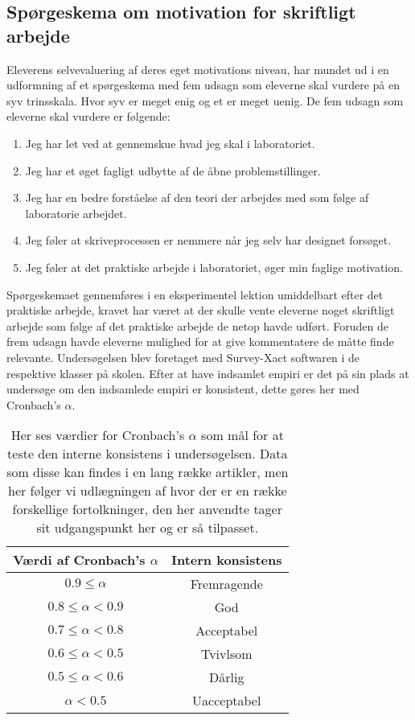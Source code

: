 \subsection{Spørgeskema om motivation for skriftligt arbejde}
\label{sub:3.2.a}
Eleverens selvevaluering af deres eget motivations niveau, har mundet ud i en udformning af et spørgeskema med fem udsagn som eleverne skal vurdere på en syv trinsskala. Hvor syv er meget enig og et er meget uenig. De fem udsagn som eleverne skal vurdere er følgende:
\begin{enumerate}
	\item Jeg har let ved at gennemskue hvad jeg skal i laboratoriet.
 	\item Jeg har et øget fagligt udbytte af de åbne problemstillinger.
	\item Jeg har en bedre forståelse af den teori der arbejdes med som følge af laboratorie arbejdet.
	\item Jeg føler at skriveprocessen er nemmere når jeg selv har designet forsøget.
	\item Jeg føler at det praktiske arbejde i laboratoriet, øger min faglige motivation.
\end{enumerate}
Spørgeskemaet gennemføres i en eksperimentel lektion umiddelbart efter det praktiske arbejde, kravet har været at der skulle vente eleverne noget skriftligt arbejde som følge af det praktiske arbejde de netop havde udført. Foruden de frem udsagn havde eleverne mulighed for at give kommentatere de måtte finde relevante. Undersøgelsen blev foretaget med Survey-Xact softwaren i de respektive klasser på skolen.  Efter at have indsamlet empiri er det på sin plads at undersøge om den indsamlede empiri er konsistent, dette gøres her med Cronbach's $\alpha$. 
\begin{table}[h!]
	\centering
	\caption{Her ses værdier for Cronbach's $\alpha$ som mål for at teste den interne konsistens i undersøgelsen. Data som disse kan findes i en lang række artikler, men her følger vi udlægningen af \citep[Tabel 1, s. 382]{Peterson1994} hvor der er en række forskellige fortolkninger, den her anvendte tager sit udgangspunkt her og er så tilpasset.}
	\label{tbl:alpha}
	\begin{tabular}{@{ } c c @{ }}
		\toprule[2.pt]
		Værdi af Cronbach's $\alpha$ & Intern konsistens\\
		\midrule
		$0.9\leq \alpha$ 		& Fremragende\\
		$0.8\leq \alpha < 0.9$ 	& God\\
		$0.7\leq \alpha < 0.8$	& Acceptabel\\
		$0.6\leq \alpha < 0.5$	& Tvivlsom\\
		$0.5\leq \alpha < 0.6$ 	& Dårlig\\
		$\alpha < 0.5$			& Uacceptabel\\
		\bottomrule[2pt]
	\end{tabular}
\end{table}
